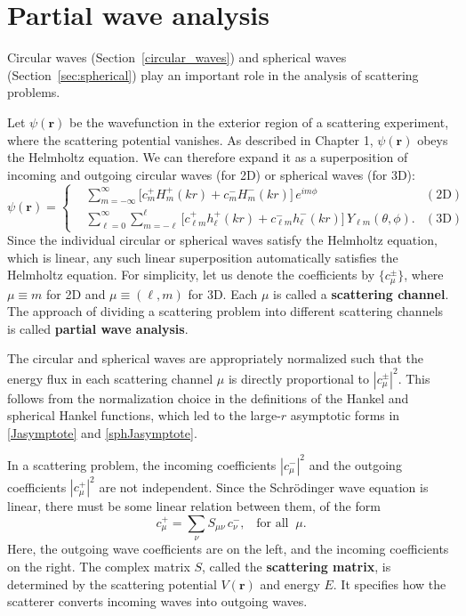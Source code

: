 \documentclass[pra,12pt]{revtex4}
\begin{document}
\section{Partial wave analysis}
\label{sec:scattering}

Circular waves (Section~\ref{circular_waves}) and spherical waves
(Section~\ref{sec:spherical}) play an important role in the analysis
of scattering problems.

Let $\psi(\mathbf{r})$ be the wavefunction in the exterior region of a
scattering experiment, where the scattering potential vanishes.  As
described in Chapter 1, $\psi(\mathbf{r})$ obeys the Helmholtz
equation.  We can therefore expand it as a superposition of incoming
and outgoing circular waves (for 2D) or spherical waves (for 3D):
\begin{equation}
  \psi(\mathbf{r}) =
  \left\{
  \begin{aligned}
    &\sum_{m=-\infty}^\infty
    \Big[c_m^+ H_m^+(kr) + c_m^- H_m^-(kr)\Big] \, e^{im\phi}
    & (\textrm{2D})
    \\
    &\sum_{\ell = 0}^\infty \sum_{m = - \ell}^\ell
    \Big[c_{\ell m}^+ h_\ell^+(kr) + c_{\ell m}^- h_\ell^-(kr)\Big] \,
    Y_{\ell m}(\theta, \phi). & (\textrm{3D})
  \end{aligned}\right.
  \label{psirdecomp}
\end{equation}
Since the individual circular or spherical waves satisfy the Helmholtz
equation, which is linear, any such linear superposition automatically
satisfies the Helmholtz equation.  For simplicity, let us denote the
coefficients by $\{c_\mu^\pm\}$, where $\mu \equiv m$ for 2D and $\mu
\equiv (\ell, m)$ for 3D.  Each $\mu$ is called a \textbf{scattering
  channel}.  The approach of dividing a scattering problem into
different scattering channels is called \textbf{partial wave
  analysis}.

The circular and spherical waves are appropriately normalized such
that the energy flux in each scattering channel $\mu$ is directly
proportional to $|c_\mu^\pm|^2$.  This follows from the normalization
choice in the definitions of the Hankel and spherical Hankel
functions, which led to the large-$r$ asymptotic forms in
\eqref{Jasymptote} and \eqref{sphJasymptote}.

In a scattering problem, the incoming coefficients $|c_\mu^-|^2$ and
the outgoing coefficients $|c_\mu^+|^2$ are not independent.  Since
the Schr\"odinger wave equation is linear, there must be some linear
relation between them, of the form
\begin{equation}
  c_{\mu}^+ = \sum_{\nu} S_{\mu \nu} \, c_{\nu}^-, \;\;\;\text{for all}\;\;\mu.
  \label{srelation}
\end{equation}
Here, the outgoing wave coefficients are on the left, and the incoming
coefficients on the right.  The complex matrix $S$, called the
\textbf{scattering matrix}, is determined by the scattering potential
$V(\mathbf{r})$ and energy $E$.  It specifies how the scatterer
converts incoming waves into outgoing waves.
\end{document}

